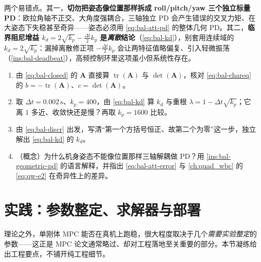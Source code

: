 \begin{pitfall}
两个易错点。其一，\textbf{切勿把姿态像位置那样拆成 roll/pitch/yaw 三个独立标量 PD}：欧拉角轴不正交、大角度强耦合，三轴独立 PD 会产生错误的交叉力矩、在大姿态下失稳甚至奇异——姿态必须用 \cref{eq:bal-att-pd} 的整体几何 PD。其二，\textbf{临界阻尼增益 $k_d=2\sqrt{k_p}-\tfrac{\Delta t}{2}k_p$ 是\emph{离散}结论}（\cref{eq:bal-kd}），别套用连续域的 $k_d=2\sqrt{k_p}$：漏掉离散修正项 $-\tfrac{\Delta t}{2}k_p$ 会让两特征值略偏复、引入轻微振荡（\cref{ins:bal-deadbeat}），高频控制环里这项虽小但系统性存在。
\end{pitfall}

\begin{practice}
\begin{enumerate}
  \item 由 \cref{eq:bal-closed} 的 $\mathbf{A}$ 直接算 $\operatorname{tr}(\mathbf{A})$ 与 $\det(\mathbf{A})$，核对 \cref{eq:bal-chareq} 的 $b=-\operatorname{tr}(\mathbf{A})$、$c=\det(\mathbf{A})$。
  \item 取 $\Delta t=0.002\,\mathrm{s}$、$k_p=400$，由 \cref{eq:bal-kd} 算 $k_d$ 与重根 $\lambda=1-\Delta t\sqrt{k_p}$；它离 $1$ 多近、收敛快还是慢？再取 $k_p=1600$ 比较。
  \item 由 \cref{eq:bal-discr} 出发，写清“第一个方括号恒正、故第二个为零”这一步，独立解出 \cref{eq:bal-kd} 的 $k_d$。
  \item （概念）为什么机身姿态不能像位置那样三轴解耦做 PD？用 \cref{ins:bal-geometric-pd} 的语言解释，并指出 \cref{eq:bal-att-error} 与 \cref{ch:quad_wbc} 的 \cref{eq:qw-e2} 在奇异性上的差异。
\end{enumerate}
\end{practice}

\section{实践：参数整定、求解器与部署}
\label{sec:practice}

理论之外，单刚体 MPC 能否在真机上跑稳，很大程度取决于几个\emph{需要实验整定}的参数——这正是 MPC 论文通常略过、却对工程落地至关重要的部分。本节凝练给出工程要点，不铺开纯工程细节。


